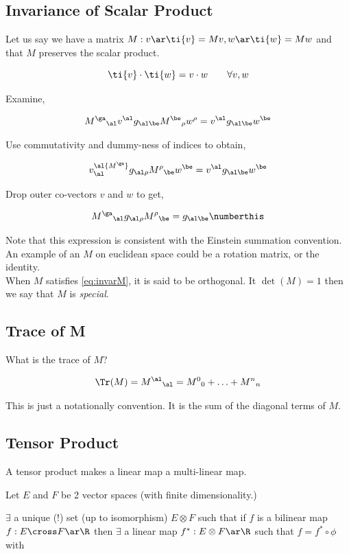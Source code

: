 \documentclass{article}
\begin{document}
\subsection{Invariance of Scalar Product}

Let us say we have a matrix $M : v \ar \ti{v} = Mv, w \ar \ti{w} = Mw$ and that $M$ preserves the scalar product.

\[ \ti{v} \cdot \ti{w} = v \cdot w \qquad \forall v, w \]

Examine,

\[ {M^\ga}_\al v^\al g_{\al\be} {M^\be}_\rho w^\rho = v^\al g_{\al\be}w^\be \]

Use commutativity and dummy-ness of indices to obtain,

\[ v^\al {M^\ga}_\al g_{\al\rho} {M^\rho}_\be w^\be = v^\al g_{\al\be}w^\be \]

Drop outer co-vectors $v$ and $w$ to get,

\[ {M^\ga}_\al g_{\al\rho} {M^\rho}_\be = g_{\al\be} \numberthis \label{eq:invarM} \]

Note that this expression is consistent with the Einstein summation convention. \\

An example of an $M$ on euclidean space could be a rotation matrix, or the identity. \\

When $M$ satisfies \ref{eq:invarM}, it is said to be orthogonal. It $\det(M) = 1$ then we say that $M$ is \textit{special}.

\subsection{Trace of M}

What is the trace of $M$?

\[ \Tr(M) = {M^\al}_\al = {M^0}_0 + \ldots + {M^n}_n\]

This is just a notationally convention. It is the sum of the diagonal terms of $M$.

\subsection{Tensor Product}

A tensor product makes a linear map a multi-linear map.


Let $E$ and $F$ be 2 vector spaces (with finite dimensionality.)

$\exists $ a unique ($!$) set (up to isomorphism) $E \otimes F$ such that if $f$ is a bilinear map $f: E \cross F \ar \R$ then $\exists$ a linear map $f^* : E \otimes F \ar \R$ such that $f = f^* \circ \phi$ with
\end{document}

